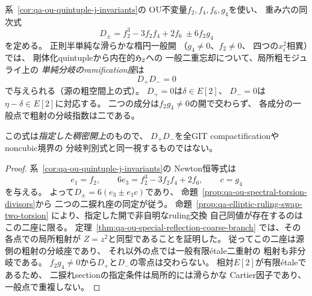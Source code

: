 \begin{corollary}[OU GIT不変量による粗忘却の分岐方程式]
\label{cor:qa-ou-coarse-branch-invariant-equations}
系~\ref{cor:qa-ou-quintuple-j-invariants}の
OU不変量$f_2,f_4,f_6,g_4$を使い、
重み六の同次式
\[
 D_\pm=
 f_2^3-3f_2f_4+2f_6\ \pm 6f_2g_4
 \tag{OU-Bpm}\label{eq:qa-ou-coarse-branch-invariants}
\]
を定める。
正則半単純な滑らかな楕円一般開
（$g_4\ne0$、$f_2\ne0$、
四つの$x_i^2$相異）では、
剛体化quintupleから内在的$\mathfrak H_2$への
一般二重忘却について、局所粗モジュライ上の
\emph{単純分岐のramification座}は
\[
 D_+D_-=0
 \tag{OU-Bdiv}\label{eq:qa-ou-coarse-ramification-divisor}
\]
で与えられる（源の粗空間上の式）。
$D_+=0$は$\delta\in E[2]$、
$D_-=0$は$\eta-\delta\in E[2]$に対応する。
二つの成分は$f_2g_4\ne0$の開で交わらず、
各成分の一般点で粗射の分岐指数は二である。

この式は\emph{指定した稠密開上}のもので、
$D_+D_-$を全GIT compactificationやnoncubic境界の
分岐判別式と同一視するものではない。
\end{corollary}
\begin{proof}
系~\ref{cor:qa-ou-quintuple-j-invariants}の
Newton恒等式は
\[
 e_1=f_2,\qquad
 6e_3=f_2^3-3f_2f_4+2f_6,\qquad c=g_4
\]
を与える。
よって$D_\pm=6(e_3\pm e_1c)$であり、
命題~\ref{prop:qa-ou-spectral-torsion-divisors}から
二つの二捩れ座の同定が従う。
命題~\ref{prop:qa-elliptic-ruling-swap-two-torsion}
により、指定した開で非自明なruling交換
自己同値が存在するのはこの二座に限る。
定理~\ref{thm:qa-ou-special-reflection-coarse-branch}
では、その各点での局所粗射が
$Z=z^2$と同型であることを証明した。
従ってこの二座は源側の粗射の分岐座であり、
それ以外の点では一般有限étale二重射の
粗射も非分岐である。
$f_2g_4\ne0$から$D_+$と$D_-$の零点は交わらない。
相対$E[2]$が有限étaleであるため、
二捩れsectionの指定条件は局所的には滑らかな
Cartier因子であり、一般点で重複しない。
\end{proof}

